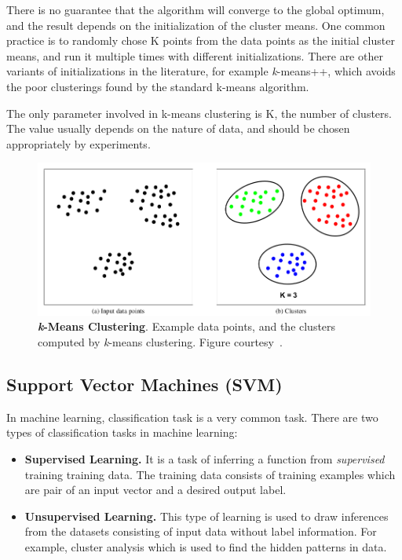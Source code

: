 There is no guarantee that the algorithm will converge to the global optimum, and the result depends on the initialization of the cluster means. One common practice is to randomly chose K points from the data points as the initial cluster means, and run it multiple times with different initializations. There are other variants of initializations in the literature, for example \textit{k}-means++, which avoids the poor clusterings found by the standard k-means algorithm.

The only parameter involved in k-means clustering is K, the number of clusters. The value usually depends on the nature of data, and should be chosen appropriately by experiments.


\begin{figure}
\centering
\includegraphics[scale=0.4]{figures/kmeansClust.png}
\caption{\textbf{\textit{k}-Means Clustering}. Example data points, and the clusters computed by \textit{k}-means clustering. Figure courtesy~\cite{junejaThesis}.}
\label{fig:kmeansPic}
\end{figure}

\subsection{Support Vector Machines (\textsc{SVM})}
In machine learning, classification task is a very common task. There are two types of classification tasks in machine learning:
\begin{itemize}
\item \textbf{Supervised Learning.} It is a task of inferring a function from \textit{supervised} training training data. The training data consists of training examples which are pair of an input vector and a desired output label.
\item \textbf{Unsupervised Learning.} This type of learning is used to draw inferences from the datasets consisting of input data without label information. For example, cluster analysis which is used to find the hidden patterns in data.
\end{itemize}


